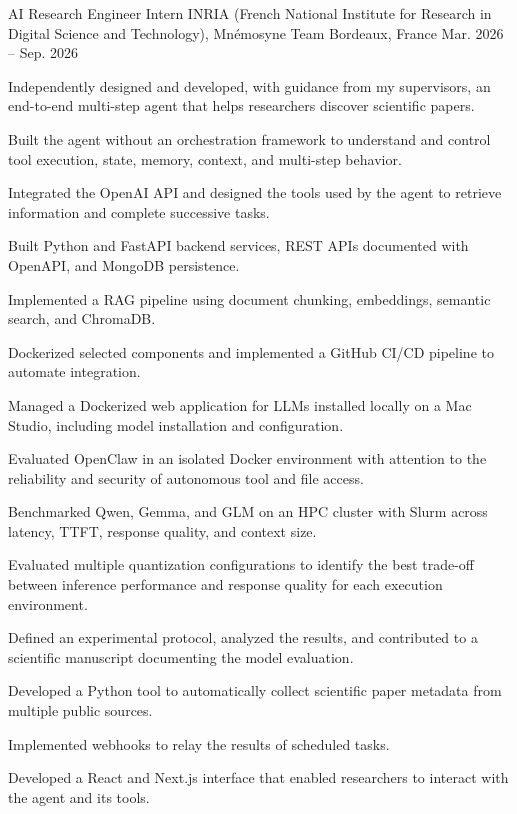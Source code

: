 
\begin{cventries}
  \cventry
    {AI Research Engineer Intern}
    {INRIA (French National Institute for Research in Digital Science and Technology), Mnémosyne Team}
    {Bordeaux, France}
    {Mar. 2026 -- Sep. 2026}
    {
      \begin{cvitems}
        \item {Independently designed and developed, with guidance from my supervisors, an end-to-end multi-step agent that helps researchers discover scientific papers.}
        \item {Built the agent without an orchestration framework to understand and control tool execution, state, memory, context, and multi-step behavior.}
        \item {Integrated the OpenAI API and designed the tools used by the agent to retrieve information and complete successive tasks.}
        \item {Built Python and FastAPI backend services, REST APIs documented with OpenAPI, and MongoDB persistence.}
        \item {Implemented a RAG pipeline using document chunking, embeddings, semantic search, and ChromaDB.}
        \item {Dockerized selected components and implemented a GitHub CI/CD pipeline to automate integration.}
        \item {Managed a Dockerized web application for LLMs installed locally on a Mac Studio, including model installation and configuration.}
        \item {Evaluated OpenClaw in an isolated Docker environment with attention to the reliability and security of autonomous tool and file access.}
        \item {Benchmarked Qwen, Gemma, and GLM on an HPC cluster with Slurm across latency, TTFT, response quality, and context size.}
        \item {Evaluated multiple quantization configurations to identify the best trade-off between inference performance and response quality for each execution environment.}
        \item {Defined an experimental protocol, analyzed the results, and contributed to a scientific manuscript documenting the model evaluation.}
        \item {Developed a Python tool to automatically collect scientific paper metadata from multiple public sources.}
        \item {Implemented webhooks to relay the results of scheduled tasks.}
        \item {Developed a React and Next.js interface that enabled researchers to interact with the agent and its tools.}
      \end{cvitems}
    }


\end{cventries}
